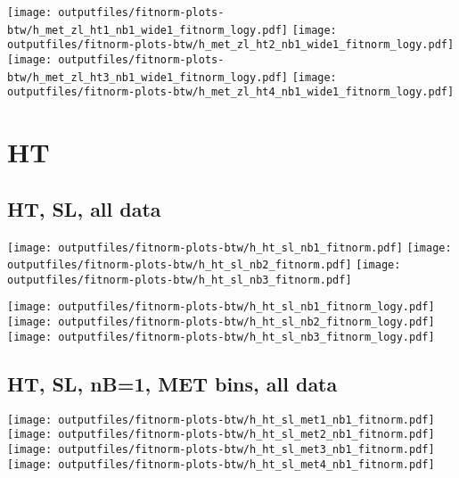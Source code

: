 \documentclass[11pt]{article}
\begin{document}
    \noindent
     \texttt{[image: outputfiles/fitnorm-plots-btw/h\_met\_zl\_ht1\_nb1\_wide1\_fitnorm\_logy.pdf]}
     \texttt{[image: outputfiles/fitnorm-plots-btw/h\_met\_zl\_ht2\_nb1\_wide1\_fitnorm\_logy.pdf]}
     \texttt{[image: outputfiles/fitnorm-plots-btw/h\_met\_zl\_ht3\_nb1\_wide1\_fitnorm\_logy.pdf]}
     \texttt{[image: outputfiles/fitnorm-plots-btw/h\_met\_zl\_ht4\_nb1\_wide1\_fitnorm\_logy.pdf]}


    \clearpage









   \section{HT}

    \subsection{ HT, SL, all data}

    \noindent
     \texttt{[image: outputfiles/fitnorm-plots-btw/h\_ht\_sl\_nb1\_fitnorm.pdf]}
     \texttt{[image: outputfiles/fitnorm-plots-btw/h\_ht\_sl\_nb2\_fitnorm.pdf]}
     \texttt{[image: outputfiles/fitnorm-plots-btw/h\_ht\_sl\_nb3\_fitnorm.pdf]}

    \noindent
     \texttt{[image: outputfiles/fitnorm-plots-btw/h\_ht\_sl\_nb1\_fitnorm\_logy.pdf]}
     \texttt{[image: outputfiles/fitnorm-plots-btw/h\_ht\_sl\_nb2\_fitnorm\_logy.pdf]}
     \texttt{[image: outputfiles/fitnorm-plots-btw/h\_ht\_sl\_nb3\_fitnorm\_logy.pdf]}


     \subsection{ HT, SL, nB=1, MET bins, all data}

    \noindent
     \texttt{[image: outputfiles/fitnorm-plots-btw/h\_ht\_sl\_met1\_nb1\_fitnorm.pdf]}
     \texttt{[image: outputfiles/fitnorm-plots-btw/h\_ht\_sl\_met2\_nb1\_fitnorm.pdf]}
     \texttt{[image: outputfiles/fitnorm-plots-btw/h\_ht\_sl\_met3\_nb1\_fitnorm.pdf]}
     \texttt{[image: outputfiles/fitnorm-plots-btw/h\_ht\_sl\_met4\_nb1\_fitnorm.pdf]}
\end{document}
